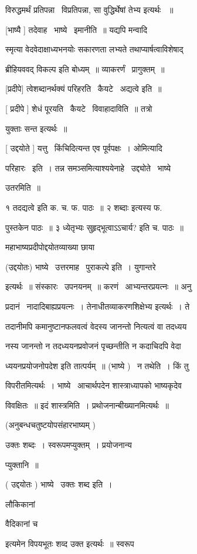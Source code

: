 \documentclass[11pt, openany]{book}
\begin{document}
विरुद्धमर्थं प्रतिपन्ना \textendash\ विप्रतिपन्ना, सा वुद्धिर्थेषां तेभ्य इत्यर्थः
~॥ 

[भाष्यै ] तदेवाह \textendash\ भाष्ये \textendash\ इमानीति~॥ यद्यपि मन्वादि \textendash\ 

स्मृत्या वेदवेदाक्षाध्यभनयोः सकारणता लभ्यते तथाप्यार्षत्वाविशेषाद् 

ब्रीहियववद् विकल्प इति बोध्यम्~॥ व्याकरर्णं \textendash\ प्रागुक्तम्~॥ 

[प्रदीपे] त्वेशब्दानर्थक्यं परिहरति \textendash\ कैयटे \textendash\ अद्यत्वे इति~॥ 

[ प्रदीपे ] शेधं पूरयति \textendash\ कैयटे \textendash\ विवाहादाविति~॥ तत्रो \textendash\ 

युक्ताः सन्त इत्यर्थः~॥ 

[ उद्दयोते ] यत्तु \textendash\ किंचिदित्यन्त एव पूर्वपक्षः~। ओमित्यादि 

परिहारः \textendash\ इति~। तन्न समञ्समित्याश्ययेनाहे \textendash\ उद्द्योते \textendash\ भाष्ये 

उतरमिति~॥ 

१ {\qt तदद्यत्वे} इति क. च. फ. पाठः~॥ २ {\qt शब्दाः इत्यस्य} फ.

पुस्तकेन पाठः~॥ ३ {\qt ध्येतृभ्यः सुहृद्भूत्वाऽऽचार्य?} इति च. पाठः~॥ 

महाभाष्यप्रदीपोद्दयोतव्याख्या छाया 

(उद्दयोतः) भाष्ये \textendash\ उत्तरमाह \textendash\ पुराकल्पे इति~। युगान्तरे 

इत्यर्थः~॥ संस्कारः \textendash\ उपनयनम्~॥ करणं \textendash\ आभ्यन्तरप्रयत्नः~॥ अनु \textendash\ 

प्रदानं \textendash\ नादादिबाह्यप्रयत्नः~। तेनाधीतव्याकरणशिक्षेभ्य इत्यर्थः~। ते 

तदानीमपि कमानुष्टानफलवत्वं वेदस्य जानन्तो नित्यत्वं वा तदध्यय \textendash\ 

नस्य जानन्तो न तदध्ययनप्रवोजनं पृच्छन्तीति न कदाचिदपि वेदा \textendash\ 

ध्ययनप्रयोजनोपदेश इति तात्पर्यम्~॥ (भाष्ये ) \textendash\ न तथेति~। किं तु 

विपरीतमित्यर्थः~। भाष्ये \textendash\ आचार्थपदेन शास्त्राध्यापको भाष्यकृदेव 

विवक्षितः~॥ इदं शास्त्रमिति~। प्रथोजनान्बीख्यानमित्यर्थः~॥ 

(अनुबन्धचतुष्टयोपसंहारभाष्यम् ) 

उक्तः शब्दः~। स्वरूपमप्युक्तम्~। प्रयोजनान्य \textendash\ 

प्युक्तानि~॥ 

( उद्दयोतः ) भाष्ये \textendash\ उक्तः शब्द इति~। {\qt लौकिकानां 

वैदिकानां च} इत्यमेन विपयभूतः शव्द उक्त इत्यर्थः~॥ स्वरूप \textendash\ 
\end{document}
